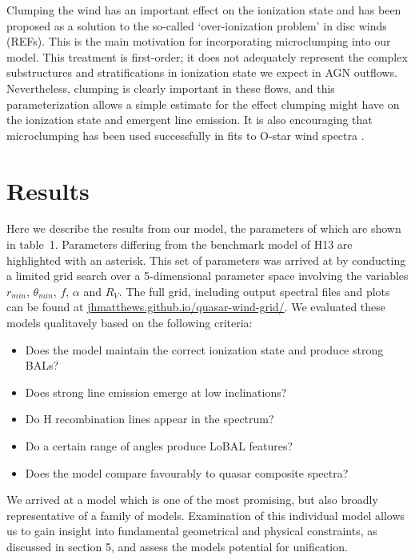 \documentclass[useAMS,usenatbib]{mn2e_x}
\begin{document}
Clumping the wind has an important effect on the ionization state and has
been proposed as a solution to the so-called `over-ionization problem' in 
disc winds (REFs). This is the main motivation for incorporating microclumping
into our model. This treatment is first-order; it does not adequately
represent the complex substructures and stratifications in ionization
state we expect in AGN outflows. Nevertheless, clumping is clearly
important in these flows, and this parameterization allows a simple estimate
for the effect clumping might have on the ionization state and emergent 
line emission. It is also encouraging that microclumping has been used 
successfully in fits to O-star wind spectra \citep{hillier1991eswingsmodel}.











\section{Results}

Here we describe the results from our model, the parameters
of which are shown in table~1.
Parameters differing from the benchmark model of
H13 are highlighted with an asterisk.
This set of parameters
was arrived at by conducting a limited grid search over a 
5-dimensional parameter space involving the variables
$r_{min}$, $\theta_{min}$, $f$, $\alpha$ and $R_V$.
The full grid, including output spectral files and plots can be found at
\url{jhmatthews.github.io/quasar-wind-grid/}.
We evaluated these models qualitavely based on the following
criteria:
\begin{itemize}
\item Does the model maintain the correct ionization state and produce strong BALs?
\item Does strong line emission emerge at low inclinations?
\item Do H recombination lines appear in the spectrum?
\item Do a certain range of angles produce LoBAL features?
\item Does the model compare favourably to quasar composite spectra?
\end{itemize}
We arrived at a model which is one of the most promising,
but also broadly representative of a family of models. 
Examination of this individual model allows us to gain insight
into fundamental geometrical and physical constraints, 
as discussed in section 5, and assess the models potential
for unification. 
\end{document}
